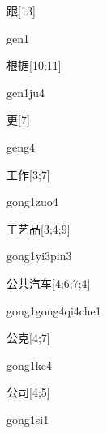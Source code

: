 \begin{verbete}[gen1]{跟}[13]
\begin{pronuncia}{gen1}
\end{pronuncia}
\end{verbete}

\begin{verbete}[gen1ju4]{根据}[10;11]
\begin{pronuncia}{gen1ju4}
\end{pronuncia}
\end{verbete}

\begin{verbete}[geng4]{更}[7]
\begin{pronuncia}{geng4}
\end{pronuncia}
\end{verbete}

\begin{verbete}{工作}[3;7]
\begin{pronuncia}{gong1zuo4}
\end{pronuncia}
\end{verbete}

\begin{verbete}{工艺品}[3;4;9]
\begin{pronuncia}{gong1yi3pin3}
\end{pronuncia}
\end{verbete}

\begin{verbete}{公共汽车}[4;6;7;4]
\begin{pronuncia}[\\]{gong1gong4qi4che1}
\end{pronuncia}
\end{verbete}

\begin{verbete}[gong1ke4]{公克}[4;7]
\begin{pronuncia}{gong1ke4}
\end{pronuncia}
\end{verbete}

\begin{verbete}[gong1si1]{公司}[4;5]
\begin{pronuncia}{gong1si1}
\end{pronuncia}
\end{verbete}

